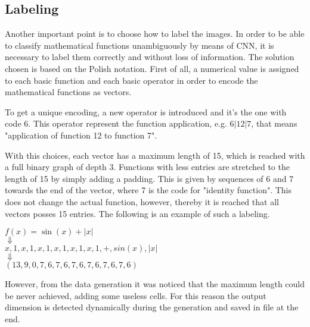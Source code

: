 \subsection{Labeling}
Another important point is to choose how to label the images. In order to be able to classify mathematical functions unambiguously by means of CNN, it is necessary to label them correctly and without loss of information. The solution chosen is based on the Polish notation.
First of all, a numerical value is assigned to each basic function and each basic operator in order to encode the mathematical functions as vectors.

To get a unique encoding, a new operator is introduced and it's the one with code 6. This operator represent the function application, e.g. $6 | 12 | 7$, that means "application of function 12 to function 7".

With this choices, each vector has a maximum length of 15, which is reached with a full binary graph of depth 3. Functions with less entries are stretched to the length of 15 by simply adding a padding. This is given by sequences of 6 and 7 towards the end of the vector, where 7 is the code for "identity function". This does not change the actual function, however, thereby it is reached that all vectors posses 15 entries. The following is an example of such a labeling.
\begin{center}
	\(f(x) = \sin(x)+|x|\) \\
	$\Downarrow$ \\ 
	\(x,1,x,1,x,1,x,1,x,1,x,1,+,sin(x),|x|\)\\
	$\Downarrow$ \\ 
	\( (13,9,0,7,6,7,6,7,6,7,6,7,6,7,6) \)\\
\end{center}

However, from the data generation it was noticed that the maximum length could be never achieved, adding some useless cells. For this reason the output dimension is detected dynamically during the generation and saved in file at the end.

\clearpage
